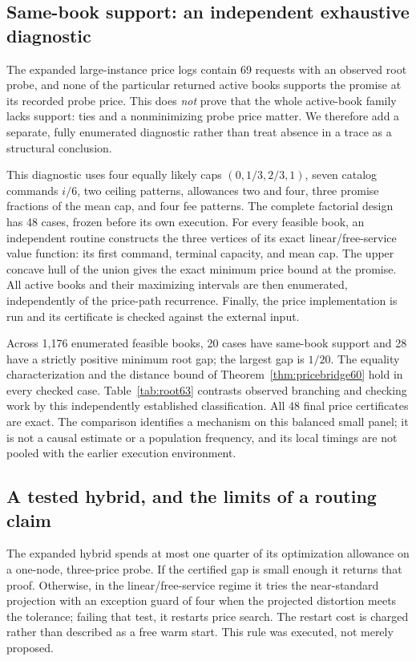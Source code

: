 \documentclass[11pt,letterpaper]{article}
\theoremstyle{definition}\newtheorem{remark}[theorem]{Remark}
\begin{document}
\subsection{Same-book support: an independent exhaustive diagnostic}\label{sec:root63}
The expanded large-instance price logs contain 69 requests with an observed root probe, and none of the particular returned active books supports the promise at its recorded probe price. This does \emph{not} prove that the whole active-book family lacks support: ties and a nonminimizing probe price matter. We therefore add a separate, fully enumerated diagnostic rather than treat absence in a trace as a structural conclusion.

This diagnostic uses four equally likely caps $(0,1/3,2/3,1)$, seven catalog commands $i/6$, two ceiling patterns, allowances two and four, three promise fractions of the mean cap, and four fee patterns. The complete factorial design has 48 cases, frozen before its own execution. For every feasible book, an independent routine constructs the three vertices of its exact linear/free-service value function: its first command, terminal capacity, and mean cap. The upper concave hull of the union gives the exact minimum price bound at the promise. All active books and their maximizing intervals are then enumerated, independently of the price-path recurrence. Finally, the price implementation is run and its certificate is checked against the external input.

Across 1,176 enumerated feasible books, 20 cases have same-book support and 28 have a strictly positive minimum root gap; the largest gap is $1/20$. The equality characterization and the distance bound of Theorem~\ref{thm:pricebridge60} hold in every checked case. Table~\ref{tab:root63} contrasts observed branching and checking work by this independently established classification. All 48 final price certificates are exact. The comparison identifies a mechanism on this balanced small panel; it is not a causal estimate or a population frequency, and its local timings are not pooled with the earlier execution environment.

\subsection{A tested hybrid, and the limits of a routing claim}
The expanded hybrid spends at most one quarter of its optimization allowance on a one-node, three-price probe. If the certified gap is small enough it returns that proof. Otherwise, in the linear/free-service regime it tries the near-standard projection with an exception guard of four when the projected distortion meets the tolerance; failing that test, it restarts price search. The restart cost is charged rather than described as a free warm start. This rule was executed, not merely proposed.
\end{document}
